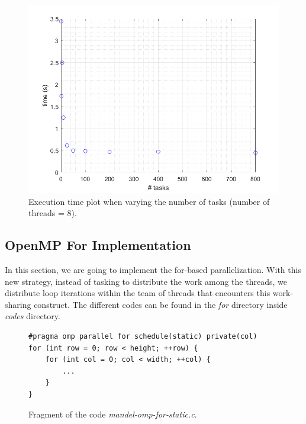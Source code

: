 \documentclass[12pt, a4paper]{article}
\begin{document}
\begin{figure}[H]
  \centering
  \includegraphics[scale=0.5]{./num_task_row}
  \caption{Execution time plot when varying the number of tasks (number of threads = 8).}
  \label{fig:num_task_row}
\end{figure}


\subsection{OpenMP For Implementation}

In this section, we are going to implement the for-based parallelization. With this new strategy, instead of tasking to distribute the work among the threads, we distribute loop iterations within the team of threads that encounters this work-sharing construct. The different codes can be found in the \textit{for} directory inside \textit{codes} directory.

\begin{figure}[H]
\begin{lstlisting}
#pragma omp parallel for schedule(static) private(col)
for (int row = 0; row < height; ++row) {
    for (int col = 0; col < width; ++col) {
    	...
    }
}
\end{lstlisting}
\caption{Fragment of the code \textit{mandel-omp-for-static.c}.}
\end{figure}
\end{document}
